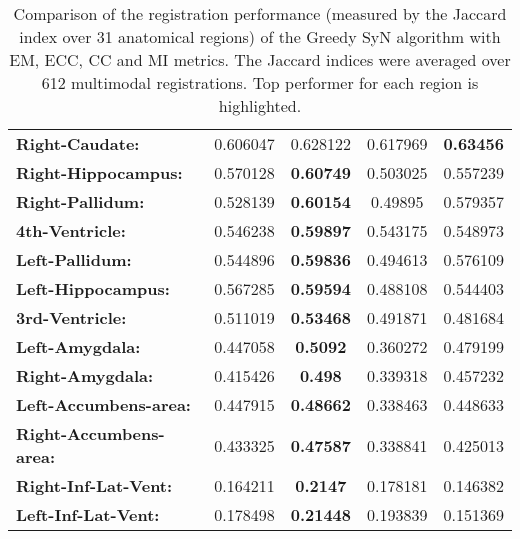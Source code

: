 \begin{table}[htbp]
{\begin{tabular}{lcccc}
    \textbf{Right-Caudate:} & 0.606047 & 0.628122 & 0.617969 & \textbf{0.63456} \\
    \textbf{Right-Hippocampus:} & 0.570128 & \textbf{0.60749} & 0.503025 & 0.557239 \\
    \textbf{Right-Pallidum:} & 0.528139 & \textbf{0.60154} & 0.49895 & 0.579357 \\
    \textbf{4th-Ventricle:} & 0.546238 & \textbf{0.59897} & 0.543175 & 0.548973 \\
    \textbf{Left-Pallidum:} & 0.544896 & \textbf{0.59836} & 0.494613 & 0.576109 \\
    \textbf{Left-Hippocampus:} & 0.567285 & \textbf{0.59594} & 0.488108 & 0.544403 \\
    \textbf{3rd-Ventricle:} & 0.511019 & \textbf{0.53468} & 0.491871 & 0.481684 \\
    \textbf{Left-Amygdala:} & 0.447058 & \textbf{0.5092} & 0.360272 & 0.479199 \\
    \textbf{Right-Amygdala:} & 0.415426 & \textbf{0.498} & 0.339318 & 0.457232 \\
    \textbf{Left-Accumbens-area:} & 0.447915 & \textbf{0.48662} & 0.338463 & 0.448633 \\
    \textbf{Right-Accumbens-area:} & 0.433325 & \textbf{0.47587} & 0.338841 & 0.425013 \\
    \textbf{Right-Inf-Lat-Vent:} & 0.164211 & \textbf{0.2147} & 0.178181 & 0.146382 \\
    \textbf{Left-Inf-Lat-Vent:} & 0.178498 & \textbf{0.21448} & 0.193839 & 0.151369 \\
    \bottomrule
    \end{tabular}}%
    \caption{Comparison of the registration performance (measured by the Jaccard index over 31 anatomical regions) of the Greedy SyN algorithm with EM, ECC, CC and MI metrics.
The Jaccard indices were averaged over 612 multimodal registrations. Top performer for each region is highlighted.}
  \label{tab:multimodal_results_seg}%
\end{table}%

